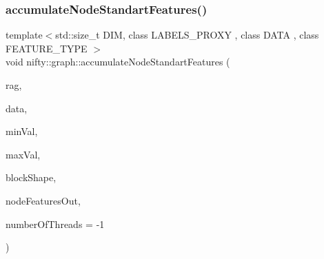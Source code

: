 \subsubsection{\texorpdfstring{accumulate\+Node\+Standart\+Features()}{accumulateNodeStandartFeatures()}}
{\footnotesize\ttfamily template$<$std\+::size\+\_\+t D\+IM, class L\+A\+B\+E\+L\+S\+\_\+\+P\+R\+O\+XY , class D\+A\+TA , class F\+E\+A\+T\+U\+R\+E\+\_\+\+T\+Y\+PE $>$ \\
void nifty\+::graph\+::accumulate\+Node\+Standart\+Features (\begin{DoxyParamCaption}\item[{const \hyperlink{classnifty_1_1graph_1_1GridRag}{Grid\+Rag}$<$ D\+IM, L\+A\+B\+E\+L\+S\+\_\+\+P\+R\+O\+XY $>$ \&}]{rag,  }\item[{const D\+A\+TA \&}]{data,  }\item[{const double}]{min\+Val,  }\item[{const double}]{max\+Val,  }\item[{const \hyperlink{namespacenifty_1_1array_a683f151f19c851754e0c6d55ed16a0c2}{array\+::\+Static\+Array}$<$ int64\+\_\+t, D\+IM $>$ \&}]{block\+Shape,  }\item[{\hyperlink{classandres_1_1View}{marray\+::\+View}$<$ F\+E\+A\+T\+U\+R\+E\+\_\+\+T\+Y\+PE $>$ \&}]{node\+Features\+Out,  }\item[{const int}]{number\+Of\+Threads = {\ttfamily -\/1} }\end{DoxyParamCaption})}

\mbox{\label{namespacenifty_1_1graph_a42c0895aee417f8a18d643aad2591c8b}} 
